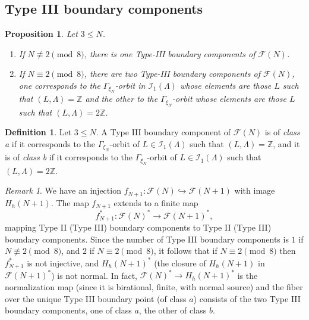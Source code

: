 \documentclass[11pt]{amsart}
\numberwithin{equation}{section}
\theoremstyle{plain}
\newtheorem{proposition}[theorem]{Proposition}
\theoremstyle{remark}
\newtheorem{remark}[theorem]{Remark}
\theoremstyle{definition}
\newtheorem{definition}[theorem]{Definition}
\newcommand{\sF}{\mathscr{F}}
\newcommand{\cI}{{\mathscr I}}
\newcommand{\hra}{\hookrightarrow}
\newcommand{\ZZ}{{\mathbb Z}}
\begin{document}
%
\subsection{Type III boundary components}
%
%
\begin{proposition}\label{prp:classifyType3}
%
Let $3\le N$. 
%
\begin{enumerate}
%
\item 
%
If $N\not\equiv 2\pmod{8}$,  there is one Type-III boundary components of $\sF(N)$.
%
\item 
%
If $N\equiv 2\pmod{8}$,     there are two Type-III boundary components of $\sF(N)$, one corresponds to the $\Gamma_{\xi_N}$-orbit in $\cI_1(\Lambda)$ whose elements are those $L$ such that  
$(L,\Lambda)=\ZZ$ and  the other to the $\Gamma_{\xi_N}$-orbit  whose elements are those $L$ such that    $(L,\Lambda)=2\ZZ$.  
%
\end{enumerate}
%
%
\end{proposition}
%
%

%
\begin{definition}\label{dfn:treatreb}
%
Let $3\le N$. A Type III boundary component of $\sF(N)$ is of \emph{class a} if it corresponds to the   $\Gamma_{\xi_N}$-orbit of $L\in\cI_1(\Lambda)$ such that  
$(L,\Lambda)=\ZZ$, and it is  of \emph{class b}  if it corresponds to the  $\Gamma_{\xi_N}$-orbit of $L\in\cI_1(\Lambda)$ such that  
$(L,\Lambda)=2\ZZ$. 
%
\end{definition}
%
%
\begin{remark}\label{rem:normalizationbb}
%
We have an injection $f_{N+1}\colon\sF(N)\hra \sF(N+1)$ with image $H_h(N+1)$. 
The map $f_{N+1}$  extends to a finite map 
%
\begin{equation}\label{effennestar}
%
f_{N+1}^{*}\colon\sF(N)^{*}\longrightarrow\sF(N+1)^{*},
%
\end{equation}
%
 mapping Type II (Type III) boundary components to Type II (Type III) boundary components. Since the number of Type III boundary components is $1$ if    $N\not\equiv 2\pmod{8}$, and $2$ if $N\equiv 2\pmod{8}$, it follows that if $N\equiv 2\pmod{8}$ then $f_{N+1}^{*}$ is not injective, and  $H_h(N+1)^{*}$ (the closure of $H_h(N+1)$ in $\sF(N+1)^{*}$) is not normal. In fact, $\sF(N)^{*}\longrightarrow H_h(N+1)^{*}$ is the normalization map (since it is birational, finite, with normal source) and the fiber over the unique Type III   boundary point (of class $a$) consists of the two Type III boundary components, one of class $a$, the other of class $b$.
%
\end{remark}
%
%
\end{document}
